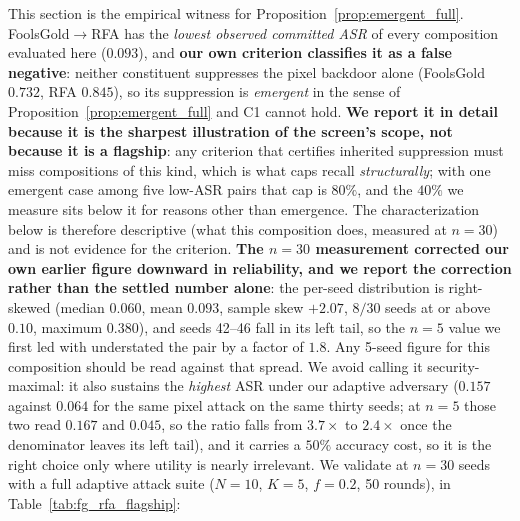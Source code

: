 \documentclass{article}
\begin{document}
This section is the empirical witness for Proposition~\ref{prop:emergent_full}. FoolsGold$\to$RFA has the \emph{lowest observed committed ASR} of every composition evaluated here ($0.093$), and \textbf{our own criterion classifies it as a false negative}: neither constituent suppresses the pixel backdoor alone (FoolsGold $0.732$, RFA $0.845$), so its suppression is \emph{emergent} in the sense of Proposition~\ref{prop:emergent_full} and C1 cannot hold. \textbf{We report it in detail because it is the sharpest illustration of the screen's scope, not because it is a flagship}: any criterion that certifies inherited suppression must miss compositions of this kind, which is what caps recall \emph{structurally}; with one emergent case among five low-ASR pairs that cap is $80\%$, and the $40\%$ we measure sits below it for reasons other than emergence. The characterization below is therefore descriptive (what this composition does, measured at $n{=}30$) and is not evidence for the criterion. \textbf{The $n{=}30$ measurement corrected our own earlier figure downward in reliability, and we report the correction rather than the settled number alone}: the per-seed distribution is right-skewed (median $0.060$, mean $0.093$, sample skew $+2.07$, $8/30$ seeds at or above $0.10$, maximum $0.380$), and seeds 42--46 fall in its left tail, so the $n{=}5$ value we first led with understated the pair by a factor of $1.8$. Any 5-seed figure for this composition should be read against that spread. We avoid calling it security-maximal: it also sustains the \emph{highest} ASR under our adaptive adversary ($0.157$ against $0.064$ for the same pixel attack on the same thirty seeds; at $n{=}5$ those two read $0.167$ and $0.045$, so the ratio falls from $3.7\times$ to $2.4\times$ once the denominator leaves its left tail), and it carries a $50\%$ accuracy cost, so it is the right choice only where utility is nearly irrelevant. We validate at $n{=}30$ seeds with a full adaptive attack suite ($N{=}10$, $K{=}5$, $f{=}0.2$, 50 rounds), in Table~\ref{tab:fg_rfa_flagship}:
\end{document}
